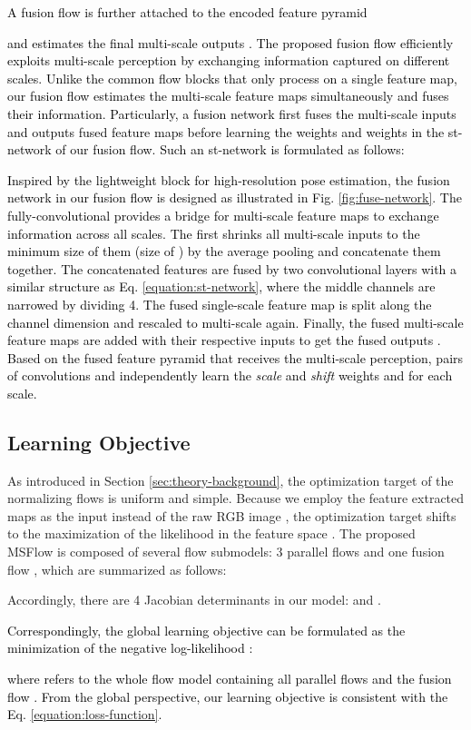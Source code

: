 \documentclass[lettersize,journal]{IEEEtran}
\newcommand{\rounda}[1]{\textcolor{black}{#1}}
\begin{document}
\rounda{
A fusion flow  is further attached to the encoded feature pyramid

and estimates the final multi-scale outputs
.
The proposed fusion flow  efficiently exploits multi-scale perception by exchanging information captured on different scales.
Unlike the common flow blocks \cite{dinh2016realnvp,kingma2018glow} that only process on a single feature map, our fusion flow estimates the multi-scale feature maps simultaneously and fuses their information. 
Particularly, a fusion network  first fuses the multi-scale inputs  and outputs fused feature maps  before learning the  weights  and  weights  in the st-network of our fusion flow. Such an st-network is formulated as follows:

Inspired by the lightweight block \cite{yu2021lite} for high-resolution pose estimation, the fusion network  in our fusion flow  is designed as illustrated in Fig. \ref{fig:fuse-network}.
The fully-convolutional  provides a bridge for multi-scale feature maps to exchange information across all scales. 
The  first shrinks all multi-scale inputs  to the minimum size of them (size of ) by the average pooling and concatenate them together. The concatenated features are fused by two convolutional layers with a similar structure as Eq. \ref{equation:st-network}, where the middle channels are narrowed by dividing 4. The fused single-scale feature map is split along the channel dimension and rescaled to multi-scale again. Finally, the fused multi-scale feature maps are added with their respective inputs to get the fused outputs .
Based on the fused feature pyramid that receives the multi-scale perception,  pairs of  convolutions  and  independently learn the \textit{scale} and \textit{shift} weights  and  for each scale.
}

\subsection{Learning Objective}
As introduced in Section \ref{sec:theory-background}, the optimization target of the normalizing flows is uniform and simple. Because we employ the feature extracted maps  as the input instead of the raw RGB image , the optimization target shifts to the maximization of the likelihood  in the feature space .
The proposed MSFlow is composed of several flow submodels: 3 parallel flows  and one fusion flow , which are summarized as follows:

Accordingly, there are 4 Jacobian determinants in our model:  and . 
\rounda{Correspondingly, the global learning objective  can be formulated as the minimization of the negative log-likelihood :

where  refers to the whole flow model containing all parallel flows  and the fusion flow . 
From the global perspective, our learning objective  is consistent with the Eq. \ref{equation:loss-function}. }
\end{document}
